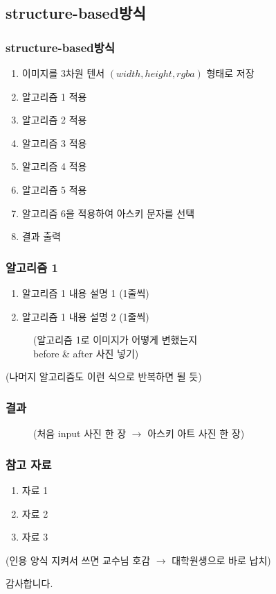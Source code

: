 \documentclass{beamer}
\newcommand{\spacing}{\hspace{0.3em}}
\newcommand{\structurebased}{\textbf{structure-based}}
\begin{document}
	\subsection{\structurebased \spacing 방식}
	\begin{frame}{}
		\frametitle{\structurebased \spacing 방식}
		\begin{enumerate}
			\item 이미지를 3차원 텐서 $ ( width, height, rgba ) $ 형태로 저장
			\item 알고리즘 1 적용
			\item 알고리즘 2 적용
			\item 알고리즘 3 적용
			\item 알고리즘 4 적용
			\item 알고리즘 5 적용
			\item 알고리즘 6을 적용하여 아스키 문자를 선택
			\item 결과 출력
		\end{enumerate}
	\end{frame}
	\begin{frame}{}
		\frametitle{알고리즘 1}
		\begin{enumerate}
			\item 알고리즘 1 내용 설명 1 (1줄씩)
			\item 알고리즘 1 내용 설명 2 (1줄씩)
		\end{enumerate}	
		\begin{figure}
			(알고리즘 1로 이미지가 어떻게 변했는지 \\ before \& after 사진 넣기)
		\end{figure}
		(나머지 알고리즘도 이런 식으로 반복하면 될 듯)
	\end{frame}


	\begin{frame}{}
		\frametitle{결과}
		\begin{figure}
			\centering
			(처음 input 사진 한 장 $ \rightarrow $ 아스키 아트 사진 한 장)
		\end{figure}
	\end{frame}

	\begin{frame}{}
		\frametitle{참고 자료}
		\begin{enumerate}
			\item 자료 1
			\item 자료 2
			\item 자료 3
		\end{enumerate}
		(인용 양식 지켜서 쓰면 교수님 호감 $ \rightarrow $ 대학원생으로 바로 납치)
	\end{frame}

	\begin{frame}
		\centering
		감사합니다.
	\end{frame}
\end{document}
